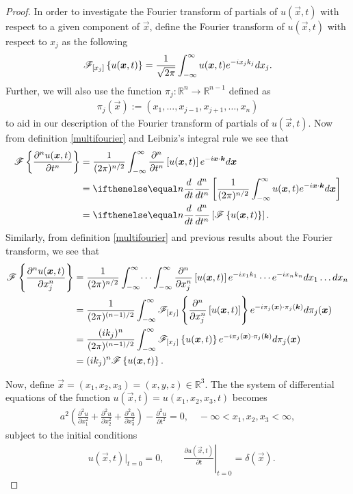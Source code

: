 \begin{proof}
  In order to investigate the Fourier transform of partials of $u(\vec{x}, t)$ with respect to a given component of $\vec{x}$, define the
  Fourier transform of $u(\vec{x}, t)$ with respect to $x_j$ as the following
  \begin{align*}
    \fourierwrt{u(\vec{x}, t)}{x_j} = \frac{1}{\sqrt{2\pi}}\int_{-\infty}^{\infty} u(\vec{x}, t) e^{-i x_jk_j }dx_j.
  \end{align*}
  Further, we will also use the function $\pi_{j}: \mathbb{R}^n \to \mathbb{R}^{n-1}$ defined as
  \begin{align*}
    \pi_{j}(\vec{x}) := (x_1, \dots, x_{j-1}, x_{j+1}, \dots, x_n)
  \end{align*}
  to aid in our description of the Fourier transform of partials of $u(\vec{x}, t)$.
  Now from definition \eqref{multifourier} and Leibniz's integral rule we see that
  \begin{align*}
    \fourier{\frac{\partial^n u(\vec{x}, t)}{\partial t^n}} &= \frac{1}{(2\pi)^{n/2}}\int_{-\infty}^\infty \frac{\partial^n }{\partial t^n}\left[u(\vec{x}, t)\right] e^{-i\vec{x}\cdot\vec{k}} d\vec{x} \\
    &= \der{t}{n}\left[\frac{1}{(2\pi)^{n/2}}\int_{-\infty}^\infty u(\vec{x}, t) e^{-i\vec{x}\cdot\vec{k}} d\vec{x} \right]\\
    &= \der{t}{n}\left[\fourier{u(\vec{x}, t)}\right].
  \end{align*}
  Similarly, from definition \eqref{multifourier} and previous results about the Fourier transform,
  we see that
  \begin{align*}
    \fourier{\frac{\partial^n u(\vec{x}, t)}{\partial x_j^n}}
    &= \frac{1}{(2\pi)^{n/2}}\int_{-\infty}^\infty \dots \int_{-\infty}^\infty\frac{\partial^n }{\partial x_j^n}\left[u(\vec{x}, t)\right] e^{-i x_1 k_1}\cdots e^{-i x_n k_n} dx_1 \dots dx_n \\
    &= \frac{1}{(2\pi)^{(n-1)/2}}\int_{-\infty}^\infty \fourierwrt{\frac{\partial^n }{\partial x_j^n}\left[u(\vec{x}, t)\right]}{x_j} e^{-i \pi_j(\vec{x}) \cdot \pi_j(\vec{k})} d\pi_j(\vec{x}) \\
    &= \frac{(ik_j)^n}{(2\pi)^{(n-1)/2}}\int_{-\infty}^\infty \fourierwrt{u(\vec{x}, t)}{x_j} e^{-i \pi_j(\vec{x}) \cdot \pi_j(\vec{k})} d\pi_j(\vec{x}) \\
    &= (ik_j)^n\fourier{u(\vec{x}, t)}.
  \end{align*}

  Now, define $\vec{x} = (x_1, x_2, x_3) = (x, y, z) \in\mathbb{R}^3$. The the system of differential equations
  of the function $u(\vec{x}, t) = u(x_1, x_2, x_3, t)$ becomes
  \begin{align*}
    a^2\left(\frac{\partial^2 u}{\partial x_1^2} + \frac{\partial^2 u}{\partial x_2^2} + \frac{\partial^2 u}{\partial x_3^2}\right) - \frac{\partial^2 u}{\partial t^2} = 0, \quad -\infty < x_1, x_2, x_3 < \infty,
  \end{align*}
  subject to the initial conditions
  \begin{align*}
    &u(\vec{x}, t)\rvert_{t=0} = 0, \qquad\left.\frac{\partial u(\vec{x}, t)}{\partial t}\right\rvert_{t=0} = \delta(\vec{x}).
  \end{align*}


\end{proof}
